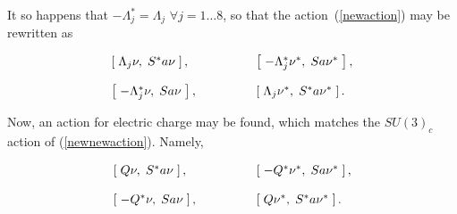 \documentclass[letterpaper,12pt,titlepage,oneside,final]{book}
\begin{document}
 It so happens that $-\Lambda_j^* = \Lambda_j$ $\forall j = 1 \dots 8$, so that the action~(\ref{newaction}) may be rewritten as 
 
 \begin{equation}\begin{array}{lll} \label{newnewaction} \left[\hspace{1mm}\Lambda_j \nu,\hspace{1mm} S^*a \nu \hspace{1mm}\right], & \hspace{1cm}&\left[\hspace{1mm}-\Lambda_j^* \nu^*, \hspace{1mm}Sa \nu^* \hspace{1mm}\right],  \vspace{4mm}\\

\left[\hspace{1mm}-\Lambda_j^* \nu,\hspace{1mm} Sa \nu \hspace{1mm}\right], & \hspace{1cm}&\left[\hspace{1mm}\Lambda_j \nu^*, \hspace{1mm}S^*a \nu^* \hspace{1mm}\right].
\end{array}\end{equation}
 
Now, an action for electric charge may be found, which matches the $SU(3)_c$ action of (\ref{newnewaction}).  Namely, 

\begin{equation}\begin{array}{lll} \label{elecaction} \left[\hspace{1mm}Q \nu,\hspace{1mm} S^*a \nu \hspace{1mm}\right], & \hspace{1cm}&\left[\hspace{1mm}-Q^* \nu^*, \hspace{1mm}Sa \nu^* \hspace{1mm}\right],  \vspace{4mm}\\

\left[\hspace{1mm}-Q^* \nu,\hspace{1mm} Sa \nu \hspace{1mm}\right], & \hspace{1cm}&\left[\hspace{1mm}Q \nu^*, \hspace{1mm}S^*a \nu^* \hspace{1mm}\right].
\end{array}\end{equation}
\end{document}
